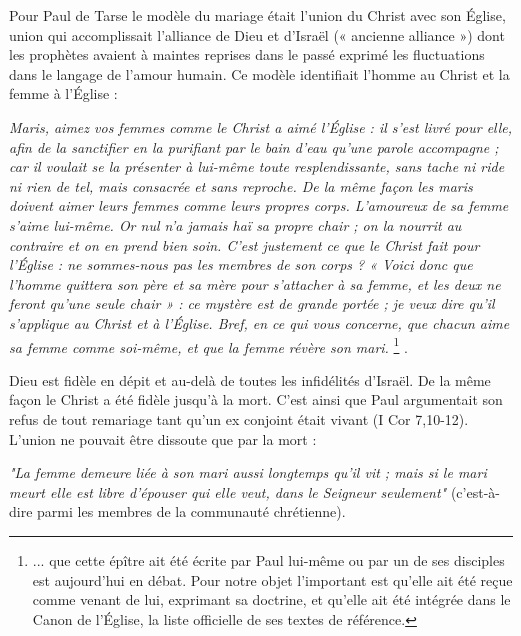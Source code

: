  Pour Paul de Tarse le modèle du mariage était l'union du Christ avec son Église, union qui accomplissait l'alliance de Dieu et d'Israël (« ancienne alliance ») dont les prophètes avaient à maintes reprises dans le passé exprimé les fluctuations dans le langage de l'amour humain. Ce modèle identifiait l'homme au Christ et la femme à l'Église :

\begin{displayquote}[Eph. 5,25-33]
\emph{Maris, aimez vos femmes comme le Christ a aimé l'Église : il s'est livré pour elle, afin de la sanctifier en la purifiant par le bain d'eau qu'une parole accompagne ; car il voulait se la présenter à lui-même toute resplendissante, sans tache ni ride ni rien de tel, mais consacrée et sans reproche. De la même façon les maris doivent aimer leurs femmes comme leurs propres corps. L'amoureux de sa femme s'aime lui-même. Or nul n'a jamais haï sa propre chair ; on la nourrit au contraire et on en prend bien soin. C'est justement ce que le Christ fait pour l'Église : ne sommes-nous pas les membres de son corps ? « Voici donc que l'homme quittera son père et sa mère pour s'attacher à sa femme, et les deux ne feront qu'une seule chair » : ce mystère est de grande portée ; je veux dire qu'il s'applique au Christ et à l'Église. Bref, en ce qui vous concerne, que chacun aime sa femme comme soi-même, et que la femme révère son mari.}
\footnote{... que cette épître ait été écrite par Paul lui-même ou par un de ses disciples est aujourd'hui en débat. Pour notre objet l'important est qu'elle ait été reçue comme venant de lui, exprimant sa doctrine, et qu'elle ait été intégrée dans le Canon de l'Église, la liste officielle de ses textes de référence.}%
.
\end{displayquote}

 Dieu est fidèle en dépit et au-delà de toutes les infidélités d'Israël. De la même façon le Christ a été fidèle jusqu'à la mort. C'est ainsi que Paul argumentait son refus de tout remariage tant qu'un ex conjoint était vivant (I Cor 7,10-12). L'union ne pouvait être dissoute que par la mort :

\begin{displayquote}[I Cor 7,39]
\emph{"La femme demeure liée à son mari aussi longtemps qu'il vit ; mais si le mari meurt elle est libre d'épouser qui elle veut, dans le Seigneur seulement"} (c'est-à-dire parmi les membres de la communauté chrétienne).
\end{displayquote}
 
